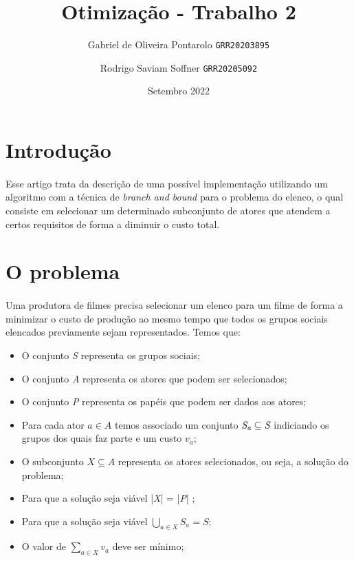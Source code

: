 \documentclass{article}
\title{Otimização - Trabalho 2}
\author{
    Gabriel de Oliveira Pontarolo 
    \texttt{GRR20203895}
    \and 
    Rodrigo Saviam Soffner
    \texttt{GRR20205092}
}
\date{Setembro 2022}
\begin{document}
\maketitle

\section{Introdução}
\paragraph{} Esse artigo trata da descrição de uma possível implementação utilizando um algoritmo com a técnica de \emph{branch and bound} para o problema do elenco, o qual consiste em selecionar um determinado subconjunto de atores que atendem a certos requisitos de forma a diminuir o custo total. 

\section{O problema}
\paragraph{} Uma produtora de filmes precisa selecionar um elenco para um filme de forma a minimizar o custo de produção ao mesmo tempo que todos os grupos sociais elencados previamente sejam representados. Temos que:

\begin{itemize}
    \item O conjunto \emph{S} representa os grupos sociais;
    \item O conjunto \emph{A} representa os atores que podem ser selecionados;
    \item O conjunto \emph{P} representa os papéis que podem ser dados aos atores;
    \item Para cada ator \emph{$a \in A$} temos associado um conjunto $\emph{S}_\emph{a} \subseteq \emph{S}$ indiciando os grupos dos quais faz parte e um custo \emph{$v_a$}; 
    \item O subconjunto \emph{$X \subseteq A$} representa os atores selecionados, ou seja, a solução do problema;
    \item Para que a solução seja viável |\emph{X}| = |\emph{P}| ;
    \item Para que a solução seja viável \emph{$\bigcup_{a \in X} S_a = S$};
    \item O valor de \emph{$\sum_{a \in X} v_a$} deve ser mínimo;
\end{itemize}
\end{document}
